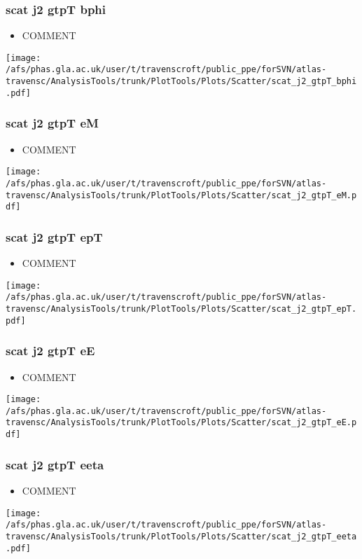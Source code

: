 \documentclass{beamer}
\begin{document}
\begin{frame}
\frametitle{scat j2 gtpT bphi}
\begin{itemize}
\item COMMENT
\end{itemize}
\begin{center}
\texttt{[image: /afs/phas.gla.ac.uk/user/t/travenscroft/public\_ppe/forSVN/atlas-travensc/AnalysisTools/trunk/PlotTools/Plots/Scatter/scat\_j2\_gtpT\_bphi.pdf]}
\end{center}
\end{frame}

\begin{frame}
\frametitle{scat j2 gtpT eM}
\begin{itemize}
\item COMMENT
\end{itemize}
\begin{center}
\texttt{[image: /afs/phas.gla.ac.uk/user/t/travenscroft/public\_ppe/forSVN/atlas-travensc/AnalysisTools/trunk/PlotTools/Plots/Scatter/scat\_j2\_gtpT\_eM.pdf]}
\end{center}
\end{frame}

\begin{frame}
\frametitle{scat j2 gtpT epT}
\begin{itemize}
\item COMMENT
\end{itemize}
\begin{center}
\texttt{[image: /afs/phas.gla.ac.uk/user/t/travenscroft/public\_ppe/forSVN/atlas-travensc/AnalysisTools/trunk/PlotTools/Plots/Scatter/scat\_j2\_gtpT\_epT.pdf]}
\end{center}
\end{frame}

\begin{frame}
\frametitle{scat j2 gtpT eE}
\begin{itemize}
\item COMMENT
\end{itemize}
\begin{center}
\texttt{[image: /afs/phas.gla.ac.uk/user/t/travenscroft/public\_ppe/forSVN/atlas-travensc/AnalysisTools/trunk/PlotTools/Plots/Scatter/scat\_j2\_gtpT\_eE.pdf]}
\end{center}
\end{frame}

\begin{frame}
\frametitle{scat j2 gtpT eeta}
\begin{itemize}
\item COMMENT
\end{itemize}
\begin{center}
\texttt{[image: /afs/phas.gla.ac.uk/user/t/travenscroft/public\_ppe/forSVN/atlas-travensc/AnalysisTools/trunk/PlotTools/Plots/Scatter/scat\_j2\_gtpT\_eeta.pdf]}
\end{center}
\end{frame}
\end{document}
